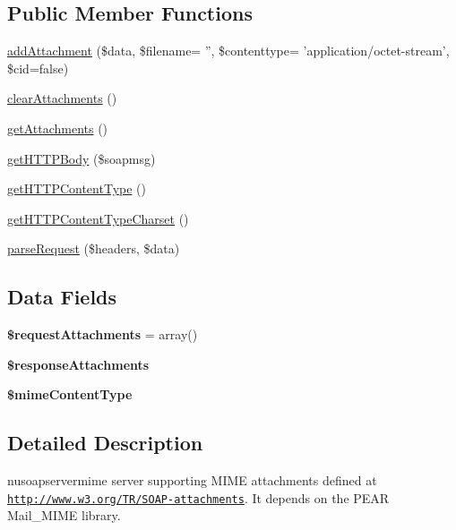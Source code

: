 \subsection*{Public Member Functions}
\begin{DoxyCompactItemize}
\item 
\hyperlink{classnusoapservermime_a05ac1d60ed38ac1db78295337c99eb86}{add\-Attachment} (\$data, \$filename= '', \$contenttype= 'application/octet-\/stream', \$cid=false)
\item 
\hyperlink{classnusoapservermime_a2b4d4199414b58bc4db009cb17ad8e3b}{clear\-Attachments} ()
\item 
\hyperlink{classnusoapservermime_aa91862c4e237ee5b53083f41633babb6}{get\-Attachments} ()
\item 
\hyperlink{classnusoapservermime_ab1e22b0858bdbe61d2d711ff442c0e78}{get\-H\-T\-T\-P\-Body} (\$soapmsg)
\item 
\hyperlink{classnusoapservermime_a2bed19ef2d537dee244535339cd6026a}{get\-H\-T\-T\-P\-Content\-Type} ()
\item 
\hyperlink{classnusoapservermime_a9051db33a9b7e50315d9222ef1c52ce9}{get\-H\-T\-T\-P\-Content\-Type\-Charset} ()
\item 
\hyperlink{classnusoapservermime_a7a69990540b6dc277f2775abd40772a1}{parse\-Request} (\$headers, \$data)
\end{DoxyCompactItemize}
\subsection*{Data Fields}
\begin{DoxyCompactItemize}
\item 
\hypertarget{classnusoapservermime_ac58af5d0476b202790c63410360c4696}{{\bfseries \$request\-Attachments} = array()}\label{classnusoapservermime_ac58af5d0476b202790c63410360c4696}

\item 
\hypertarget{classnusoapservermime_a065527a5618c8bb7597a79b33b410a6e}{{\bfseries \$response\-Attachments}}\label{classnusoapservermime_a065527a5618c8bb7597a79b33b410a6e}

\item 
\hypertarget{classnusoapservermime_afca41a43fc6c89107faf7c34a5dedb32}{{\bfseries \$mime\-Content\-Type}}\label{classnusoapservermime_afca41a43fc6c89107faf7c34a5dedb32}

\end{DoxyCompactItemize}


\subsection{Detailed Description}
nusoapservermime server supporting M\-I\-M\-E attachments defined at \href{http://www.w3.org/TR/SOAP-attachments}{\tt http\-://www.\-w3.\-org/\-T\-R/\-S\-O\-A\-P-\/attachments}. It depends on the P\-E\-A\-R Mail\-\_\-\-M\-I\-M\-E library.

